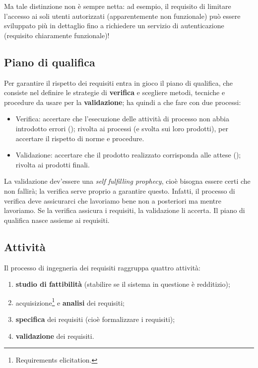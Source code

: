 \documentclass[a4paper]{article}
\begin{document}
		
Ma tale distinzione non è sempre netta: ad esempio, il requisito di limitare l'accesso ai soli utenti autorizzati (apparentemente non funzionale) può essere sviluppato più in dettaglio fino a richiedere un servizio di autenticazione (requisito chiaramente funzionale)!

		
	\subsection{Piano di qualifica}

		
Per garantire il rispetto dei requisiti entra in gioco il piano di qualifica, che consiste nel definire le strategie di \textbf{verifica} e scegliere metodi, tecniche e procedure da usare per la \textbf{validazione}; ha quindi a che fare con due processi:
		
	\begin{itemize}
		
			
	\item Verifica: accertare che l'esecuzione delle attività di processo non abbia introdotto errori (); rivolta ai processi (e svolta sui loro prodotti), per accertare il rispetto di norme e procedure.
			
	\item Validazione: accertare che il prodotto realizzato corrisponda alle attese (); rivolta ai prodotti finali.
		
	\end{itemize}

		
La validazione dev'essere una \emph{self fulfilling prophecy}, cioè bisogna essere certi che non fallirà; la verifica serve proprio a garantire questo. Infatti, il processo di verifica deve assicurarci che lavoriamo bene non a posteriori ma mentre lavoriamo. Se la verifica assicura i requisiti, la validazione li accerta. Il piano di qualifica nasce assieme ai requisiti.

		
	\subsection{Attività}

		
Il processo di ingegneria dei requisiti raggruppa quattro attività:
		
	\begin{enumerate}
		
			
	\item \textbf{studio di fattibilità} (stabilire se il sistema in questione è redditizio);
			
	\item acquisizione\footnote{Requirements elicitation.} e \textbf{analisi} dei requisiti;
			
	\item \textbf{specifica} dei requisiti (cioè formalizzare i requisiti);
			
	\item \textbf{validazione} dei requisiti.
		
	\end{enumerate}
\end{document}
